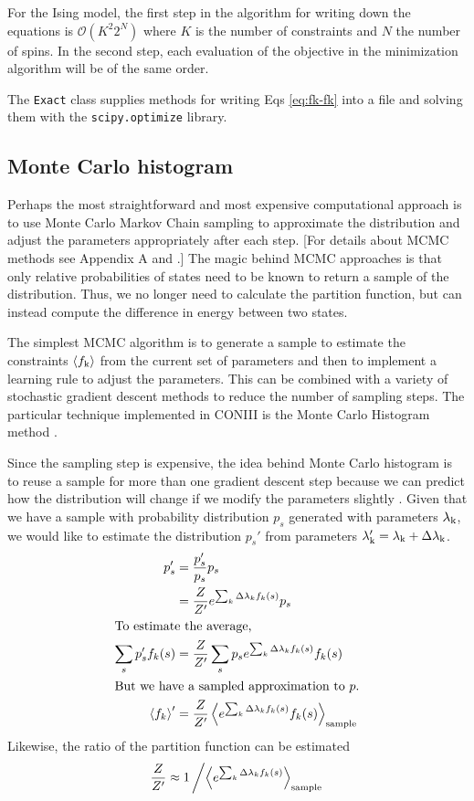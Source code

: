 \documentclass[aps,prl,twocolumn]{revtex4-1}
\begin{document}
For the Ising model, the first step in the algorithm for writing down the equations is $\mathcal{O}(K^2 2^{N})$ where $K$ is the number of constraints and $N$ the number of spins. In the second step, each evaluation of the objective in the minimization algorithm will be of the same order.

The {\tt Exact} class supplies methods for writing Eqs \ref{eq:fk-fk} into a file and solving them with the {\tt scipy.optimize} library.


\subsection{Monte Carlo histogram}
Perhaps the most straightforward and most expensive computational approach is to use Monte Carlo Markov Chain sampling to approximate the distribution and adjust the parameters appropriately after each step. [For details about MCMC methods see Appendix A and \cite{MacKay:2005wc}.] The magic behind MCMC approaches is that only relative probabilities of states need to be known to return a sample of the distribution. Thus, we no longer need to calculate the partition function, but can instead compute the difference in energy between two states.

The simplest MCMC algorithm is to generate a sample to estimate the constraints $\left<f_{\rm k}\right>$ from the current set of parameters and then to implement a learning rule to adjust the parameters. This can be combined with a variety of stochastic gradient descent methods to reduce the number of sampling steps. The particular technique implemented in CONIII is the Monte Carlo Histogram method \cite{Broderick:2007wq}.

Since the sampling step is expensive, the idea behind Monte Carlo histogram is to reuse a sample for more than one gradient descent step because we can predict how the distribution will change if we modify the parameters slightly \cite{Broderick:2007wq}. Given that we have a sample with probability distribution $p_s$ generated with parameters $\lambda_{\rm k}$, we would like to estimate the distribution $p_s'$ from parameters $\lambda_{\rm k}' = \lambda_{\rm k}+\Delta\lambda_{\rm k}$.
\begin{align}
	p_s' &= \frac{p'_s}{p_s}p_s\\
		&= \frac{Z}{Z'}e^{\sum_k \Delta\lambda_k f_k(s)} p_s\\
\intertext{To estimate the average,}
	\sum_s p_s' f_k(s) &= \frac{Z}{Z'} \sum_s p_s e^{\sum_k \Delta\lambda_k f_k(s)} f_k(s)\\
\intertext{But we have a sampled approximation to $p$.}
	\left<f_k\right>' &= \frac{Z}{Z'} \left<e^{\sum_k \Delta\lambda_k f_k(s)} f_k(s)\right>_{\rm sample}
\end{align}
Likewise, the ratio of the partition function can be estimated
\begin{align}
	\frac{Z}{Z'} \approx 1\left/\left<e^{\sum_k \Delta\lambda_k f_k(s)}\right>_{\rm sample}\right.
\end{align}
\end{document}
